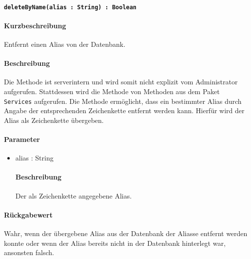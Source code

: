 \paragraph{\texttt{deleteByName(alias : String) : Boolean}}%
\paragraph*{Kurzbeschreibung}
Entfernt einen Alias von der Datenbank.
\paragraph*{Beschreibung}
Die Methode ist serverintern und wird somit nicht explizit vom Administrator aufgerufen.
Stattdessen wird die Methode von Methoden aus dem Paket \texttt{Services} aufgerufen.
Die Methode ermöglicht, dass ein bestimmter Alias durch Angabe der entsprechenden Zeichenkette entfernt werden kann.
Hierfür wird der Alias als Zeichenkette übergeben.
\paragraph*{Parameter}
\begin{itemize}
    \item alias : String
    		\paragraph*{Beschreibung}
    		Der als Zeichenkette angegebene Alias.
\end{itemize}
\paragraph*{Rückgabewert}
Wahr, wenn der übergebene Alias aus der Datenbank der Aliasse entfernt werden konnte oder wenn der Alias bereits nicht in der Datenbank hinterlegt war, ansonsten falsch.
